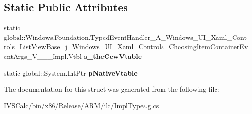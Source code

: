 \subsection*{Static Public Attributes}
\begin{DoxyCompactItemize}
\item 
\mbox{\label{struct_windows_1_1_foundation_1_1_typed_event_handler___a___windows___u_i___xaml___controls___li81aac31d5f7498ed4eec5cad5e67da4e_ae7c45d75d85ad43947d94447e73e5327}} 
static global\+::\+Windows.\+Foundation.\+Typed\+Event\+Handler\+\_\+\+A\+\_\+\+Windows\+\_\+\+U\+I\+\_\+\+Xaml\+\_\+\+Controls\+\_\+\+List\+View\+Base\+\_\+j\+\_\+\+Windows\+\_\+\+U\+I\+\_\+\+Xaml\+\_\+\+Controls\+\_\+\+Choosing\+Item\+Container\+Event\+Args\+\_\+\+V\+\_\+\+\_\+\+\_\+\+Impl.\+Vtbl {\bfseries s\+\_\+the\+Ccw\+Vtable}
\item 
\mbox{\label{struct_windows_1_1_foundation_1_1_typed_event_handler___a___windows___u_i___xaml___controls___li81aac31d5f7498ed4eec5cad5e67da4e_a3d74e803d5a0429f17038fb73946a31e}} 
static global\+::\+System.\+Int\+Ptr {\bfseries p\+Native\+Vtable}
\end{DoxyCompactItemize}


The documentation for this struct was generated from the following file\+:\begin{DoxyCompactItemize}
\item 
I\+V\+S\+Calc/bin/x86/\+Release/\+A\+R\+M/ilc/Impl\+Types.\+g.\+cs\end{DoxyCompactItemize}
